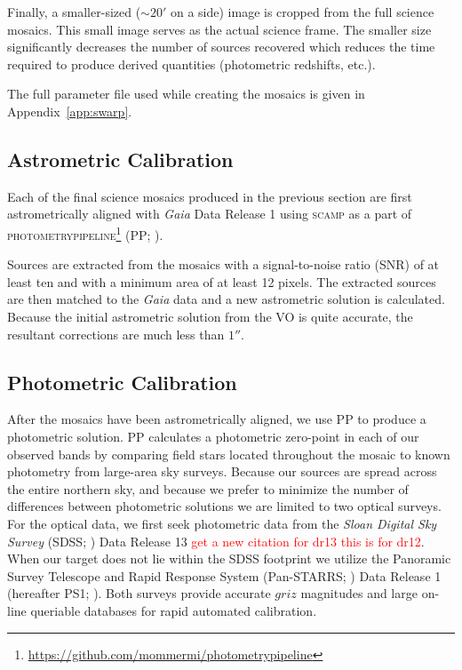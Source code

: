 \documentclass[apj, revtex4-1]{emulateapj}
\newcommand{\editorial}[1]{\textcolor{red}{#1}}
\begin{document}
Finally, a smaller-sized ($\sim20'$ on a side) image is cropped from the full science mosaics. This small image serves as the actual science frame. The smaller size significantly decreases the number of sources recovered which reduces the time required to produce derived quantities (photometric redshifts, etc.).

The full parameter file used while creating the mosaics is given in Appendix~\ref{app:swarp}.

\subsection{Astrometric Calibration}
Each of the final science mosaics produced in the previous section are first astrometrically aligned with \textit{Gaia} \citep{GaiaCollaboration2016} Data Release 1 \citep{GaiaCollaboration2016a} using \textsc{scamp} \citep{Bertin2006} as a part of \textsc{photometrypipeline}\footnote{\url{https://github.com/mommermi/photometrypipeline}} (PP; \citealt{Mommert2017}).

Sources are extracted from the mosaics with a signal-to-noise ratio (SNR) of at least ten and with a minimum area of at least 12 pixels. The extracted sources are then matched to the \textit{Gaia} data and a new astrometric solution is calculated. Because the initial astrometric solution from the VO is quite accurate, the resultant corrections are much less than $1''$.

\subsection{Photometric Calibration}
After the mosaics have been astrometrically aligned, we use PP to produce a photometric solution. PP calculates a photometric zero-point in each of our observed bands by comparing field stars located throughout the mosaic to known photometry from large-area sky surveys. Because our sources are spread across the entire northern sky, and because we prefer to minimize the number of differences between photometric solutions we are limited to two optical surveys. For the optical data, we first seek photometric data from the \textit{Sloan Digital Sky Survey} (SDSS; \citealt{York2000}) Data Release 13 \citep{Alam2015} \editorial{get a new citation for dr13 this is for dr12}. When our target does not lie within the SDSS footprint we utilize the Panoramic Survey Telescope and Rapid Response System (Pan-STARRS; \citealt{Chambers2016}) Data Release 1 (hereafter PS1; \citealt{Flewelling2016}). Both surveys provide accurate $griz$ magnitudes and large on-line queriable databases for rapid automated calibration.
\end{document}

